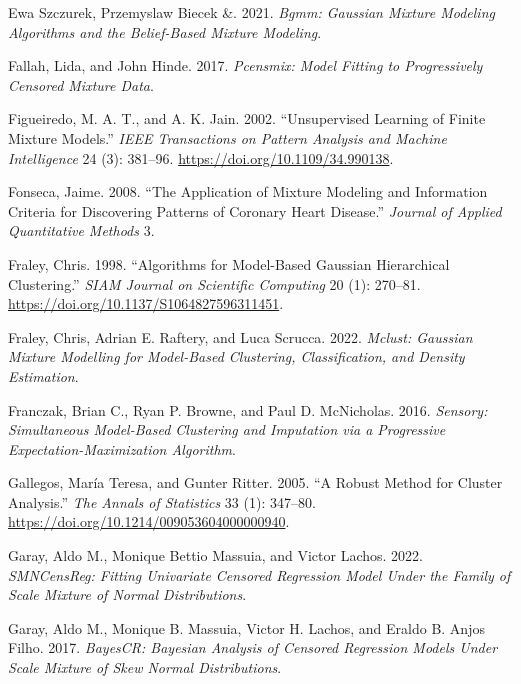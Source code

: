 \begin{CSLReferences}{1}{0}
\leavevmode{}%
Ewa Szczurek, Przemyslaw Biecek \&. 2021. \emph{Bgmm: Gaussian Mixture Modeling Algorithms and the Belief-Based Mixture Modeling}.

\leavevmode{}%
Fallah, Lida, and John Hinde. 2017. \emph{Pcensmix: Model Fitting to Progressively Censored Mixture Data}.

\leavevmode{}%
Figueiredo, M. A. T., and A. K. Jain. 2002. {``Unsupervised Learning of Finite Mixture Models.''} \emph{IEEE Transactions on Pattern Analysis and Machine Intelligence} 24 (3): 381--96. \url{https://doi.org/10.1109/34.990138}.

\leavevmode{}%
Fonseca, Jaime. 2008. {``The Application of Mixture Modeling and Information Criteria for Discovering Patterns of Coronary Heart Disease.''} \emph{Journal of Applied Quantitative Methods} 3.

\leavevmode{}%
Fraley, Chris. 1998. {``Algorithms for {Model-Based Gaussian Hierarchical Clustering}.''} \emph{SIAM Journal on Scientific Computing} 20 (1): 270--81. \url{https://doi.org/10.1137/S1064827596311451}.

\leavevmode{}%
Fraley, Chris, Adrian E. Raftery, and Luca Scrucca. 2022. \emph{Mclust: Gaussian Mixture Modelling for Model-Based Clustering, Classification, and Density Estimation}.

\leavevmode{}%
Franczak, Brian C., Ryan P. Browne, and Paul D. McNicholas. 2016. \emph{Sensory: Simultaneous Model-Based Clustering and Imputation via a Progressive Expectation-Maximization Algorithm}.

\leavevmode{}%
Gallegos, María Teresa, and Gunter Ritter. 2005. {``A Robust Method for Cluster Analysis.''} \emph{The Annals of Statistics} 33 (1): 347--80. \url{https://doi.org/10.1214/009053604000000940}.

\leavevmode{}%
Garay, Aldo M., Monique Bettio Massuia, and Victor Lachos. 2022. \emph{SMNCensReg: Fitting Univariate Censored Regression Model Under the Family of Scale Mixture of Normal Distributions}.

\leavevmode{}%
Garay, Aldo M., Monique B. Massuia, Victor H. Lachos, and Eraldo B. Anjos Filho. 2017. \emph{BayesCR: Bayesian Analysis of Censored Regression Models Under Scale Mixture of Skew Normal Distributions}.


\end{CSLReferences}
